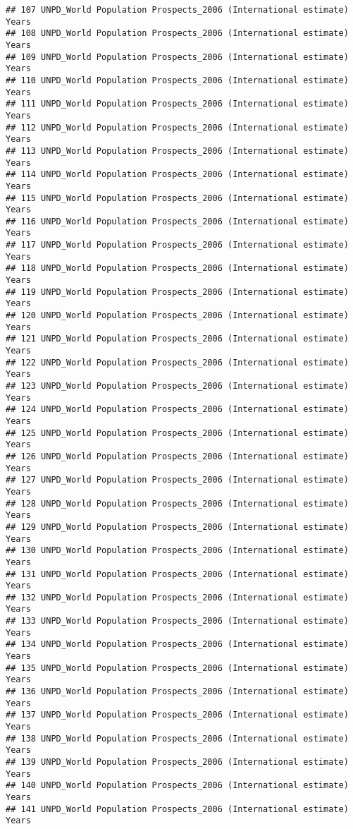 \documentclass[]{article}
\begin{document}
\begin{verbatim}
## 107 UNPD_World Population Prospects_2006 (International estimate) Years
## 108 UNPD_World Population Prospects_2006 (International estimate) Years
## 109 UNPD_World Population Prospects_2006 (International estimate) Years
## 110 UNPD_World Population Prospects_2006 (International estimate) Years
## 111 UNPD_World Population Prospects_2006 (International estimate) Years
## 112 UNPD_World Population Prospects_2006 (International estimate) Years
## 113 UNPD_World Population Prospects_2006 (International estimate) Years
## 114 UNPD_World Population Prospects_2006 (International estimate) Years
## 115 UNPD_World Population Prospects_2006 (International estimate) Years
## 116 UNPD_World Population Prospects_2006 (International estimate) Years
## 117 UNPD_World Population Prospects_2006 (International estimate) Years
## 118 UNPD_World Population Prospects_2006 (International estimate) Years
## 119 UNPD_World Population Prospects_2006 (International estimate) Years
## 120 UNPD_World Population Prospects_2006 (International estimate) Years
## 121 UNPD_World Population Prospects_2006 (International estimate) Years
## 122 UNPD_World Population Prospects_2006 (International estimate) Years
## 123 UNPD_World Population Prospects_2006 (International estimate) Years
## 124 UNPD_World Population Prospects_2006 (International estimate) Years
## 125 UNPD_World Population Prospects_2006 (International estimate) Years
## 126 UNPD_World Population Prospects_2006 (International estimate) Years
## 127 UNPD_World Population Prospects_2006 (International estimate) Years
## 128 UNPD_World Population Prospects_2006 (International estimate) Years
## 129 UNPD_World Population Prospects_2006 (International estimate) Years
## 130 UNPD_World Population Prospects_2006 (International estimate) Years
## 131 UNPD_World Population Prospects_2006 (International estimate) Years
## 132 UNPD_World Population Prospects_2006 (International estimate) Years
## 133 UNPD_World Population Prospects_2006 (International estimate) Years
## 134 UNPD_World Population Prospects_2006 (International estimate) Years
## 135 UNPD_World Population Prospects_2006 (International estimate) Years
## 136 UNPD_World Population Prospects_2006 (International estimate) Years
## 137 UNPD_World Population Prospects_2006 (International estimate) Years
## 138 UNPD_World Population Prospects_2006 (International estimate) Years
## 139 UNPD_World Population Prospects_2006 (International estimate) Years
## 140 UNPD_World Population Prospects_2006 (International estimate) Years
## 141 UNPD_World Population Prospects_2006 (International estimate) Years

\end{verbatim}
\end{document}
